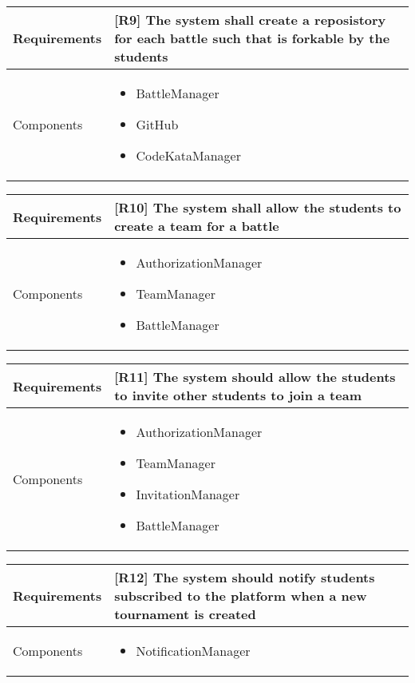 \begin{tabular}{|p{3cm}|p{10cm}|}
    \hline
    Requirements & [R9] The system shall create a reposistory for each battle such that is forkable by the students \\
    \hline
    Components & 
    \begin{itemize}
        \item BattleManager
        \item GitHub
        \item CodeKataManager
    \end{itemize} 
    \\
    \hline
\end{tabular}

\begin{tabular}{|p{3cm}|p{10cm}|}
    \hline
    Requirements & [R10] The system shall allow the students to create a team for a battle \\
    \hline
    Components & 
    \begin{itemize}
        \item AuthorizationManager
        \item TeamManager
        \item BattleManager
    \end{itemize} 
    \\
    \hline
\end{tabular}

\begin{tabular}{|p{3cm}|p{10cm}|}
    \hline
    Requirements & [R11] The system should allow the students to invite other students to join a team \\
    \hline
    Components & 
    \begin{itemize}
        \item AuthorizationManager
        \item TeamManager
        \item InvitationManager
        \item BattleManager
    \end{itemize} 
    \\
    \hline
\end{tabular}

\begin{tabular}{|p{3cm}|p{10cm}|}
    \hline
    Requirements & [R12] The system should notify students subscribed to the platform when a new tournament is created \\
    \hline
    Components & 
    \begin{itemize}
        \item NotificationManager
    \end{itemize} 
    \\
    \hline
\end{tabular}

